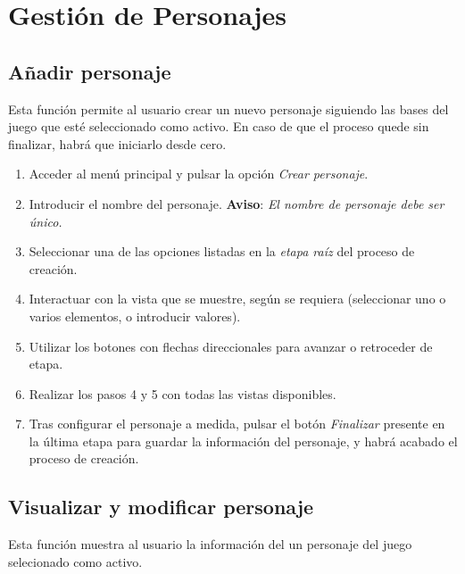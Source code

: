 
\section{Gestión de Personajes}
\subsection{Añadir personaje}
Esta función permite al usuario crear un nuevo personaje siguiendo las bases del juego que esté seleccionado como activo.
En caso de que el proceso quede sin finalizar, habrá que iniciarlo desde cero.\medskip

\begin{enumerate}
    \item Acceder al menú principal y pulsar la opción \textit{Crear personaje}.
    \item Introducir el nombre del personaje. \textbf{Aviso}: \textit{El nombre de personaje debe ser único.}
    \item Seleccionar una de las opciones listadas en la \textit{etapa raíz} del proceso de creación.
    \item Interactuar con la vista que se muestre, según se requiera (seleccionar uno o varios elementos, o 
    introducir valores).
    \item Utilizar los botones con flechas direccionales para avanzar o retroceder de etapa.
    \item Realizar los pasos 4 y 5 con todas las vistas disponibles.
    \item Tras configurar el personaje a medida, pulsar el botón \textit{Finalizar} presente en la última 
    etapa para guardar la información del personaje, y habrá acabado el proceso de creación.
\end{enumerate}

\subsection{Visualizar y modificar personaje}
Esta función muestra al usuario la información del un personaje del juego selecionado como activo.\medskip


